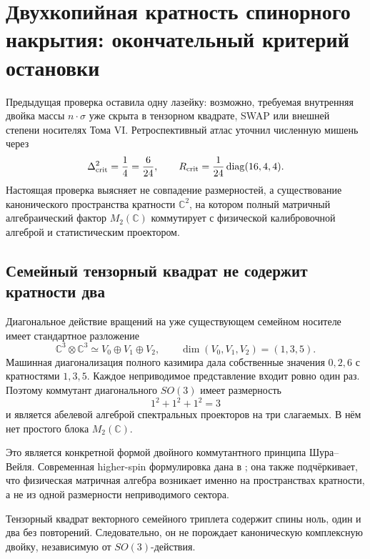 \chapter{Двухкопийная кратность спинорного накрытия: окончательный критерий остановки}

Предыдущая проверка оставила одну лазейку: возможно, требуемая внутренняя
двойка массы $n\cdot\sigma$ уже скрыта в тензорном квадрате, SWAP или
внешней степени носителях Тома VI. Ретроспективный атлас уточнил численную
мишень через
\begin{equation}
 \Delta_{\rm crit}^2=\frac14=\frac6{24},
 \qquad
 R_{\rm crit}=\frac1{24}\operatorname{diag}(16,4,4).
\end{equation}
Настоящая проверка выясняет не совпадение размерностей, а существование
канонического пространства кратности $\mathbb C^2$, на котором полный
матричный алгебраический фактор $M_2(\mathbb C)$ коммутирует с
физической калибровочной алгеброй и статистическим проектором.

\section{Семейный тензорный квадрат не содержит кратности два}

Диагональное действие вращений на уже существующем семейном носителе
имеет стандартное разложение
\begin{equation}
 \mathbb C^3\otimes\mathbb C^3
 \simeq V_0\oplus V_1\oplus V_2,
 \qquad
 \dim(V_0,V_1,V_2)=(1,3,5).
 \label{eq:v6-two-copy-so3-decomposition}
\end{equation}
Машинная диагонализация полного казимира дала собственные значения
$0,2,6$ с кратностями $1,3,5$. Каждое неприводимое представление входит
ровно один раз. Поэтому коммутант диагонального $SO(3)$ имеет размерность
\begin{equation}
 1^2+1^2+1^2=3
\end{equation}
и является абелевой алгеброй спектральных проекторов на три слагаемых.
В нём нет простого блока $M_2(\mathbb C)$.

Это является конкретной формой двойного коммутантного принципа
Шура--Вейля. Современная higher-spin формулировка дана в
; она также подчёркивает, что физическая матричная
алгебра возникает именно на пространствах кратности, а не из одной
размерности неприводимого сектора.

\begin{proposition}
Тензорный квадрат векторного семейного триплета содержит спины ноль, один
и два без повторений. Следовательно, он не порождает каноническую
комплексную двойку, независимую от $SO(3)$-действия.
\end{proposition}

